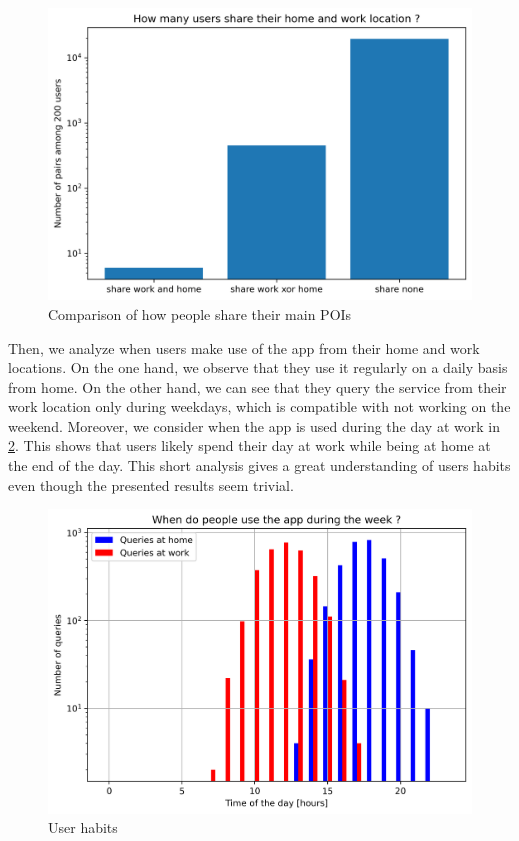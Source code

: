 \documentclass[10pt,conference,compsocconf]{IEEEtran}
\begin{document}
\begin{figure}
  \includegraphics[width=\columnwidth]{share.png}
  \caption{Comparison of how people share their main POIs}
  \label{share_fig}
\end{figure}

Then, we analyze when users make use of the app from their home and work locations. On the one hand, we observe that they use it regularly on a daily basis from home. On the other hand, we can see that they query the service from their work location only during weekdays, which is compatible with not working on the weekend. Moreover, we consider when the app is used during the day at work in \ref{when_fig}. This shows that users likely spend their day at work while being at home at the end of the day. This short analysis gives a great understanding of users habits even though the presented results seem trivial.

\begin{figure}
  \includegraphics[width=\columnwidth]{when.png}
  \caption{User habits}
  \label{when_fig}
\end{figure}
\end{document}
